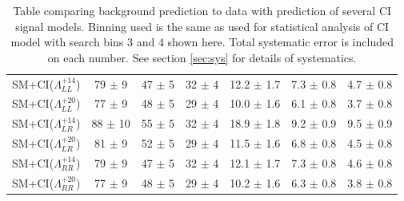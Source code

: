 \begin {table}[h]
\begin{center}
\begin{tabular}{  l | c c c | c c c  }
			\hline
			SM+CI($\Lambda^{+14}_{LL}$) & 79 $\pm$ 9 & 47 $\pm$ 5 & 32 $\pm$ 4 & 12.2 $\pm$ 1.7 & 7.3 $\pm$ 0.8 & 4.7 $\pm$ 0.8 \\
			SM+CI($\Lambda^{+20}_{LL}$) & 77 $\pm$ 9 & 48 $\pm$ 5 & 29 $\pm$ 4 & 10.0 $\pm$ 1.6 & 6.1 $\pm$ 0.8 & 3.7 $\pm$ 0.8 \\
			SM+CI($\Lambda^{+14}_{LR}$) & 88 $\pm$ 10 & 55 $\pm$ 5 & 32 $\pm$ 4 & 18.9 $\pm$ 1.8 & 9.2 $\pm$ 0.9 & 9.5 $\pm$ 0.9 \\
			SM+CI($\Lambda^{+20}_{LR}$) & 81 $\pm$ 9 & 52 $\pm$ 5 & 29 $\pm$ 4 & 11.5 $\pm$ 1.6 & 6.8 $\pm$ 0.8 & 4.5 $\pm$ 0.8 \\
			SM+CI($\Lambda^{+14}_{RR}$) & 79 $\pm$ 9 & 47 $\pm$ 5 & 32 $\pm$ 4 & 12.1 $\pm$ 1.7 & 7.3 $\pm$ 0.8 & 4.6 $\pm$ 0.8 \\
			SM+CI($\Lambda^{+20}_{RR}$) & 77 $\pm$ 9 & 48 $\pm$ 5 & 29 $\pm$ 4 & 10.2 $\pm$ 1.6 & 6.3 $\pm$ 0.8 & 3.8 $\pm$ 0.8 \\
			\hline
			\hline
		\end{tabular}
	  	\caption{Table comparing background prediction to data with prediction of several CI signal models. Binning used is the same as used for statistical analysis of CI model with search bins 3 and 4 shown here. Total systematic error is included on each number. See section \ref{sec:sys} for details of systematics.}
	  	\label{tab:CI_results2}
	  	\end{center}
	\end {table}



